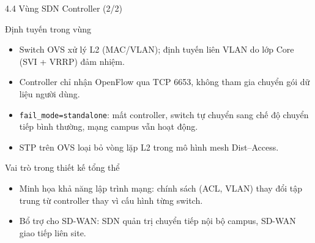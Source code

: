 \begin{frame}{4.4 Vùng SDN Controller (2/2)}
    \small
    \begin{block}{Định tuyến trong vùng}
        \begin{itemize}
            \item Switch OVS xử lý L2 (MAC/VLAN); định tuyến liên VLAN do
                  lớp Core (SVI + VRRP) đảm nhiệm.
            \item Controller chỉ nhận OpenFlow qua TCP 6653, không tham
                  gia chuyển gói dữ liệu người dùng.
            \item \texttt{fail\_mode=standalone}: mất controller, switch
                  tự chuyển sang chế độ chuyển tiếp bình thường, mạng
                  campus vẫn hoạt động.
            \item STP trên OVS loại bỏ vòng lặp L2 trong mô hình mesh
                  Dist--Access.
        \end{itemize}
    \end{block}
    \vspace{0.12cm}
    \begin{block}{Vai trò trong thiết kế tổng thể}
        \begin{itemize}
            \item Minh họa khả năng lập trình mạng: chính sách (ACL,
                  VLAN) thay đổi tập trung từ controller thay vì cấu hình
                  từng switch.
            \item Bổ trợ cho SD-WAN: SDN quản trị chuyển tiếp nội bộ
                  campus, SD-WAN giao tiếp liên site.
        \end{itemize}
    \end{block}
\end{frame}

